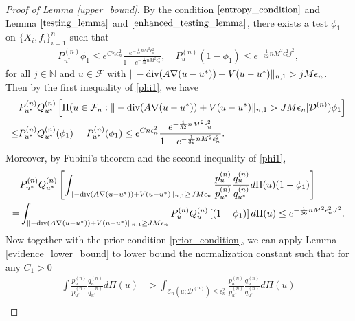 \documentclass{article}
\newcommand{\F}{\mathcal{F}}
\newcommand{\D}{\mathcal{D}}
\renewcommand{\div}{\textnormal{div}}
\theoremstyle{plain}
\theoremstyle{definition}
\theoremstyle{remark}
\begin{document}
\begin{proof}[Proof of Lemma \ref{upper_bound}]
    By the condition $\eqref{entropy_condition}$ and  Lemma $\ref{testing_lemma}$ and $\ref{enhanced_testing_lemma}$, there exists a test $\phi_1$ on $\{X_i, f_i\}_{i=1}^n $ such that
    \begin{align} \label{phi1}
        P_{u^*}^{(n)} \phi_1 \leq e^{C n \epsilon_n^2} \frac{e^{-\frac{1}{32}n M^2 \epsilon_n^2}}{1 - e^{-\frac{1}{32}n M^2 \epsilon_n^2}}, \quad P_u^{(n)} (1-\phi_1) \leq e^{-\frac{1}{32}n M^2 \epsilon_n^2 j^2},
    \end{align}
    for all $j \in \mathbb{N}$ and $u \in \F$ with $\|-\div (A \nabla (u - u^*)) + V(u - u^*) \|_{n, 1} > j M \epsilon_n$. Then by the first inequality of \eqref{phi1}, we have
    \begin{equation} \label{conditioned_on_phi1}
    \begin{aligned}
        & P_{u^*}^{(n)} Q_{u^*}^{(n)} \left[\Pi(u \in \F_n: \|-\div (A \nabla (u - u^*)) + V(u - u^*) \|_{n, 1} >  J M \epsilon_n | \D^{(n)} ) \phi_1 \right] \\
        \leq & P_{u^*}^{(n)} Q_{u^*}^{(n)} ( \phi_1) = P_{u^*}^{(n)} (\phi_1) \leq e^{C n \epsilon_n^2} \frac{e^{-\frac{1}{32}n M^2 \epsilon_n^2}}{1 - e^{-\frac{1}{32}n M^2 \epsilon_n^2}}.
    \end{aligned}
    \end{equation}
    Moreover, by Fubini's theorem and the second inequality of \eqref{phi1},
    \begin{equation} \label{upper_bound_numerator}
        \begin{aligned}
            & P_{u^*}^{(n)} Q_{u^*}^{(n)} \left[ \int_{\|-\div (A \nabla (u - u^*)) + V(u - u^*) \|_{n, 1} \geq J M \epsilon_{n}} \frac{p_{u}^{(n)}}{p_{u^*}^{(n)}} \frac{q_{u}^{(n)}}{q_{u^*}^{(n)}} d \Pi(u)  (1 - \phi_{1}) \right] \\
     = & \int_{\|-\div (A \nabla (u - u^*)) + V(u - u^*) \|_{n, 1} \geq J M \epsilon_{n}}    P_{u}^{(n)} Q_{u}^{(n)} \left[(1 - \phi_{1}) \right] d \Pi(u) \leq  e^{-\frac{1}{36} n M^2 \epsilon_{n}^2 J^2}. 
        \end{aligned}
    \end{equation}
Now together with the prior condition \eqref{prior_condition}, we can apply Lemma \ref{evidence_lower_bound} to lower bound the normalization constant such that for any $C_1 > 0$
\begin{equation} \label{lower_bound_denominator}
    \begin{aligned}
        \int \frac{p_{u}^{(n)}}{p_{u^*}^{(n)}} \frac{q_{u}^{(n)}}{q_{u^*}^{(n)}} d \Pi(u) & > \int_{\mathcal{E}_n(u; \D^{(n)}) \leq \epsilon_n^2} \frac{p_{u}^{(n)}}{p_{u^*}^{(n)}} \frac{q_{u}^{(n)}}{q_{u^*}^{(n)}} d \Pi(u) \\

\end{aligned}
\end{equation}
\end{proof}
\end{document}
